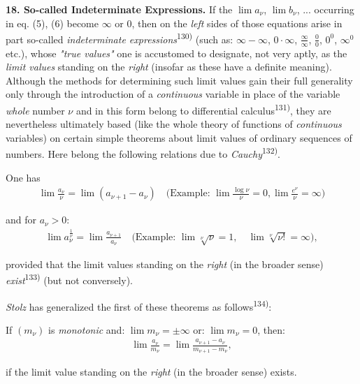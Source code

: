 \thispagestyle{fancy}

\vspace{0.5cm}

\textbf{18. So-called Indeterminate Expressions.} If the $\lim a_\nu$, $\lim b_\nu$, ... occurring in eq. (5), (6) become $\infty$ or $0$, then on the \textit{left} sides of those equations arise in part so-called \textit{indeterminate expressions}\textsuperscript{130)} (such as: $\infty - \infty$, $0 \cdot \infty$, $\frac{\infty}{\infty}$, $\frac{0}{0}$, $0^0$, $\infty^0$ etc.), whose \textit{"true values"} one is accustomed to designate, not very aptly, as the \textit{limit values} standing on the \textit{right} (insofar as these have a definite meaning). Although the methods for determining such limit values gain their full generality only through the introduction of a \textit{continuous} variable in place of the variable \textit{whole} number $\nu$ and in this form belong to differential calculus\textsuperscript{131)}, they are nevertheless ultimately based (like the whole theory of functions of \textit{continuous} variables) on certain simple theorems about limit values of ordinary sequences of numbers. Here belong the following relations due to \textit{Cauchy}\textsuperscript{132)}.

One has
\begin{align}
\lim \frac{a_\nu}{\nu} = \lim (a_{\nu+1} - a_\nu) \quad \text{(Example: } \lim \frac{\log \nu}{\nu} = 0, \lim \frac{e^\nu}{\nu} = \infty\text{)}
\end{align}

and for $a_\nu > 0$:
\begin{align}
\lim a_\nu^{\frac{1}{\nu}} = \lim \frac{a_{\nu+1}}{a_\nu} \quad \text{(Example: } \lim \sqrt[\nu]{\nu} = 1, \quad \lim \sqrt[\nu]{\nu!} = \infty\text{)},
\end{align}

provided that the limit values standing on the \textit{right} (in the broader sense) \textit{exist}\textsuperscript{133)} (but not conversely).

\textit{Stolz} has generalized the first of these theorems as follows\textsuperscript{134)}:

If $(m_\nu)$ is \textit{monotonic} and: $\lim m_\nu = \pm \infty$ or: $\lim m_\nu = 0$, then:
\begin{align}
\lim \frac{a_\nu}{m_\nu} = \lim \frac{a_{\nu+1} - a_\nu}{m_{\nu+1} - m_\nu},
\end{align}

if the limit value standing on the \textit{right} (in the broader sense) exists.

